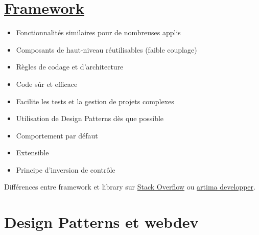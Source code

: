 \hypertarget{framework}{%
\section{\texorpdfstring{\href{http://en.wikipedia.org/wiki/Software_framework}{Framework}}{Framework}}\label{framework}}

\begin{itemize}
\tightlist
\item
  Fonctionnalités similaires pour de nombreuses applis
\item
  Composants de haut-niveau réutilisables (faible couplage)
\item
  Règles de codage et d'architecture
\item
  Code sûr et efficace
\item
  Facilite les tests et la gestion de projets complexes
\item
  Utilisation de Design Patterns dès que possible
\item
  Comportement par défaut
\item
  Extensible
\item
  Principe d'inversion de contrôle
\end{itemize}

Différences entre framework et library sur
\href{http://stackoverflow.com/questions/148747/what-is-the-difference-between-a-framework-and-a-library}{Stack
Overflow} ou
\href{http://www.artima.com/forums/flat.jsp?forum=106\&thread=152104}{artima
developper}.

\hypertarget{design-patterns-et-webdev}{%
\section{Design Patterns et webdev}\label{design-patterns-et-webdev}}

